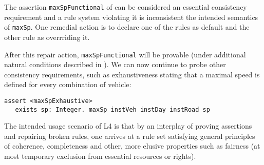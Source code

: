 The assertion \texttt{maxSpFunctional} of  can be considered an essential
consistency requirement and a rule system violating it is inconsistent \wrt{} the intended semantics of \texttt{maxSp}. One
remedial action is to declare one of the rules as default and the other rule
as overrriding it.

After this repair action, \texttt{maxSpFunctional} will be provable (under
additional natural conditions described in ). We can now
continue to probe other consistency requirements, such as exhaustiveness
stating that a maximal speed is defined for every combination of vehicle:

\begin{lstlisting}
assert <maxSpExhaustive>
   exists sp: Integer. maxSp instVeh instDay instRoad sp
\end{lstlisting}

The intended usage scenario of L4 is that by an interplay of proving
assertions and repairing broken rules, one arrives at a rule set satisfying
general principles of coherence, completeness and other, more elusive
properties such as fairness (at most temporary exclusion from essential
resources or rights).


